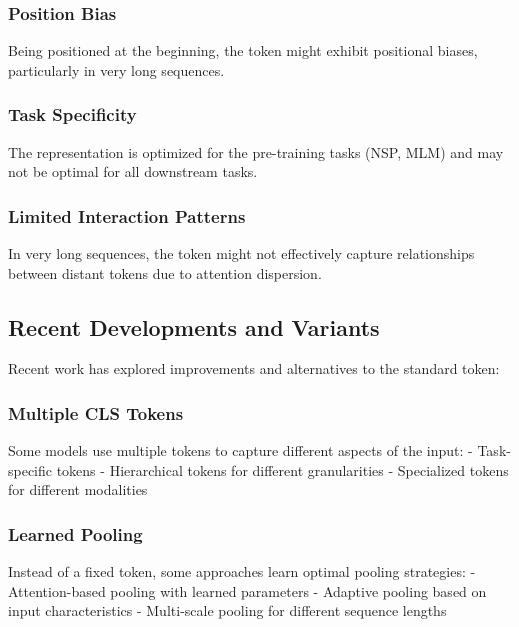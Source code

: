 \subsubsection{Position Bias}
Being positioned at the beginning, the \cls{} token might exhibit positional biases, particularly in very long sequences.

\subsubsection{Task Specificity}
The \cls{} representation is optimized for the pre-training tasks (NSP, MLM) and may not be optimal for all downstream tasks.

\subsubsection{Limited Interaction Patterns}
In very long sequences, the \cls{} token might not effectively capture relationships between distant tokens due to attention dispersion.

\subsection{Recent Developments and Variants}

Recent work has explored improvements and alternatives to the standard \cls{} token:

\subsubsection{Multiple CLS Tokens}
Some models use multiple \cls{} tokens to capture different aspects of the input:
- Task-specific \cls{} tokens
- Hierarchical \cls{} tokens for different granularities
- Specialized \cls{} tokens for different modalities

\begin{comment}
Feedback: Convert the above into latex items, with a little elaboration
\end{comment}

\subsubsection{Learned Pooling}
Instead of a fixed \cls{} token, some approaches learn optimal pooling strategies:
- Attention-based pooling with learned parameters
- Adaptive pooling based on input characteristics
- Multi-scale pooling for different sequence lengths

